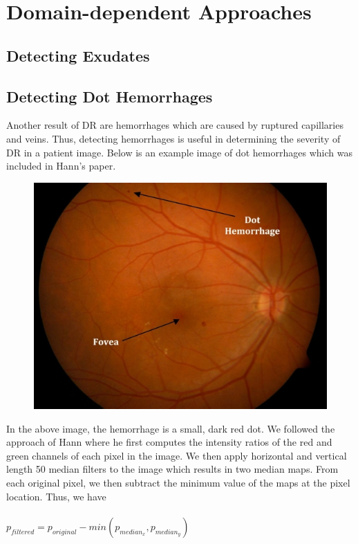 \documentclass{article} %
\begin{document}
\section{Domain-dependent Approaches}
\subsection{Detecting Exudates}
\subsection{Detecting Dot Hemorrhages}
Another result of DR are hemorrhages which are caused by ruptured capillaries and veins. Thus, detecting hemorrhages is useful in determining the severity of DR in a patient image. Below is an example image of dot hemorrhages which was included in Hann's paper.
\begin{figure}[H]
	\centerline{\includegraphics[scale=0.3]{./images/dh.jpg}}
\end{figure}
In the above image, the hemorrhage is a small, dark red dot. We followed the approach of Hann where he first computes the intensity ratios of the red and green channels of each pixel in the image. We then apply horizontal and vertical length 50 median filters to the image which results in two median maps. From each original pixel, we then subtract the minimum value of the maps at the pixel location. Thus, we have \\ \\
$p_{filtered} = p_{original} - min(p_{median_x},p_{median_y})$ \\ \\
\end{document}
